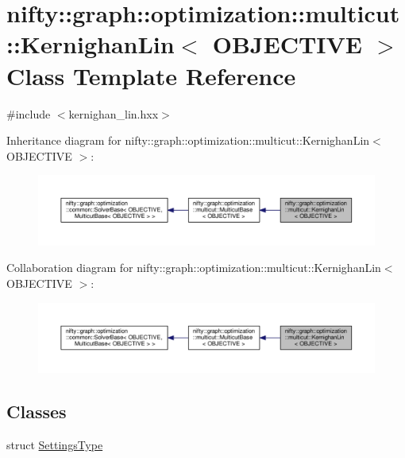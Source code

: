 \hypertarget{classnifty_1_1graph_1_1optimization_1_1multicut_1_1KernighanLin}{}\section{nifty\+:\+:graph\+:\+:optimization\+:\+:multicut\+:\+:Kernighan\+Lin$<$ O\+B\+J\+E\+C\+T\+I\+V\+E $>$ Class Template Reference}
\label{classnifty_1_1graph_1_1optimization_1_1multicut_1_1KernighanLin}


{\ttfamily \#include $<$kernighan\+\_\+lin.\+hxx$>$}



Inheritance diagram for nifty\+:\+:graph\+:\+:optimization\+:\+:multicut\+:\+:Kernighan\+Lin$<$ O\+B\+J\+E\+C\+T\+I\+V\+E $>$\+:\nopagebreak
\begin{figure}[H]
\begin{center}
\leavevmode
\includegraphics[width=350pt]{classnifty_1_1graph_1_1optimization_1_1multicut_1_1KernighanLin__inherit__graph}
\end{center}
\end{figure}


Collaboration diagram for nifty\+:\+:graph\+:\+:optimization\+:\+:multicut\+:\+:Kernighan\+Lin$<$ O\+B\+J\+E\+C\+T\+I\+V\+E $>$\+:\nopagebreak
\begin{figure}[H]
\begin{center}
\leavevmode
\includegraphics[width=350pt]{classnifty_1_1graph_1_1optimization_1_1multicut_1_1KernighanLin__coll__graph}
\end{center}
\end{figure}
\subsection*{Classes}
\begin{DoxyCompactItemize}
\item 
struct \hyperlink{structnifty_1_1graph_1_1optimization_1_1multicut_1_1KernighanLin_1_1SettingsType}{Settings\+Type}
\end{DoxyCompactItemize}
